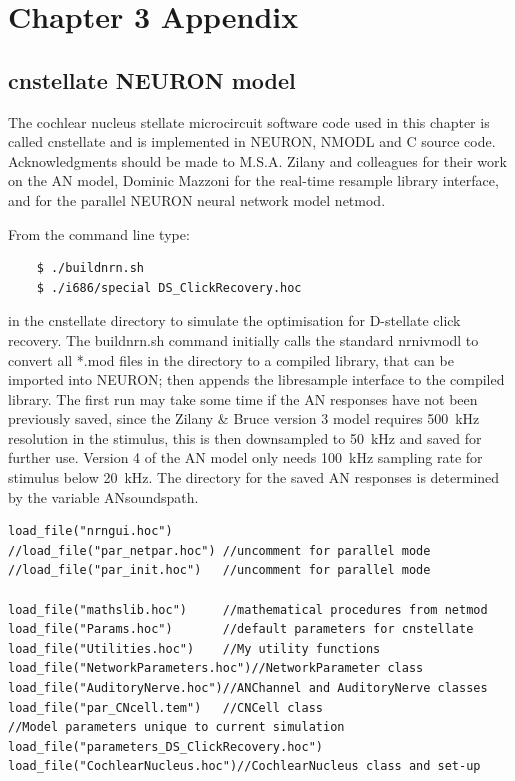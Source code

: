 \graphicspath{{../figures/}{./gfx/}{/media/data/Work/cnstellate/}{/media/data/Work/cnstellate/Responses/}}

\chapter{Chapter 3 Appendix}\label{sec:ch3appendix}
\section{\textsf{cnstellate} NEURON model}

The cochlear nucleus stellate microcircuit software code used in this chapter is
called \textsf{cnstellate} and is implemented in NEURON, NMODL and C source
code. Acknowledgments should be made to M.S.A. Zilany and colleagues for their
work on the AN model, Dominic Mazzoni for the real-time resample library
interface, and \citet{MiglioreCanniaEtAl:2006} for the parallel NEURON
neural network model \textsf{netmod}.

From the command line type:
\begin{verbatim}
    $ ./buildnrn.sh
    $ ./i686/special DS_ClickRecovery.hoc
\end{verbatim}
in the \textsf{cnstellate} directory to simulate the optimisation for D-stellate
click recovery.  The \textsf{buildnrn.sh} command initially calls the standard
\textsf{nrnivmodl} to convert all *.mod files in the directory to a compiled
library, that can be imported into NEURON; then appends the libresample
interface to the compiled library. The 
first run may take some time if the AN
responses have not been previously saved, since the Zilany \& Bruce version 3
model requires 500~kHz resolution in the stimulus, this is then downsampled to
50~kHz and saved for further use. Version 4 of the AN model
\citep{ZilanyBruceEtAl:2009} only needs 100~kHz sampling rate for stimulus below
20~kHz. The directory for the saved AN responses is determined by the variable
\textsf{ANsoundspath}.

\begin{lstlisting}[label=lst:headerlines,caption={Headerlines in \mbox{\textsf{DS\_Recover\.hoc}} show a typical setup in a \texsf{cnstellate} setup.}]
load_file("nrngui.hoc")
//load_file("par_netpar.hoc") //uncomment for parallel mode
//load_file("par_init.hoc")   //uncomment for parallel mode

load_file("mathslib.hoc")     //mathematical procedures from netmod
load_file("Params.hoc")       //default parameters for cnstellate  
load_file("Utilities.hoc")    //My utility functions 
load_file("NetworkParameters.hoc")//NetworkParameter class
load_file("AuditoryNerve.hoc")//ANChannel and AuditoryNerve classes 
load_file("par_CNcell.tem")   //CNCell class
//Model parameters unique to current simulation
load_file("parameters_DS_ClickRecovery.hoc") 
load_file("CochlearNucleus.hoc")//CochlearNucleus class and set-up

\end{lstlisting}


